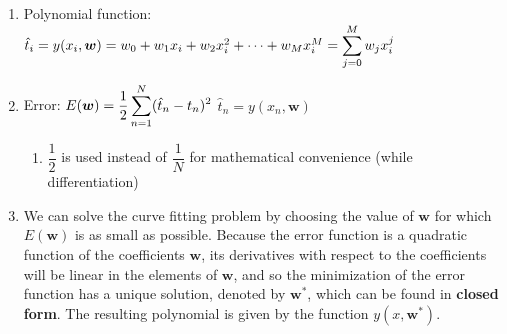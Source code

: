 \begin{enumerate}
    \item Polynomial function:
    $
        \hat{t}_i
        = y(x_i, \bm{w})
        = w_0 + w_1x_i + w_2x_i^2 + \cdots + w_M x_i^M
        = \displaystyle\sum ^M _{j=0} w_j x_i^j
    $
    \hfill \cite{ml/book/Pattern-Recognition-And-Machine-Learning/Christopher-M-Bishop}

    \item Error:
    $
        E(\bm{w})
        = \dfrac{1}{2} \displaystyle\sum_{n=1}^N (\hat{t}_n - t_n)^2
    $
    \hfill
    $
        \hat{t}_n = y(x_n, \bm{w})
    $
    \hfill \cite{ml/book/Pattern-Recognition-And-Machine-Learning/Christopher-M-Bishop}
    \begin{enumerate}
        \item $\dfrac{1}{2}$ is used instead of $\dfrac{1}{N}$ for mathematical convenience (while differentiation)
    \end{enumerate}

    \item We can solve the curve fitting problem by choosing the value of $\bm{w}$ for which $E(\bm{w})$ is as small as possible.
    Because the error function is a quadratic function of the coefficients $\bm{w}$, its derivatives with respect to the coefficients will be linear in the elements of $\bm{w}$, and so the minimization of the error function has a unique solution, denoted by $\bm{w}^\ast$, which can be found in \textbf{closed form}.
    The resulting polynomial is given by the function $y(x, \bm{w}^\ast)$.
    \hfill \cite{ml/book/Pattern-Recognition-And-Machine-Learning/Christopher-M-Bishop}
\end{enumerate}















